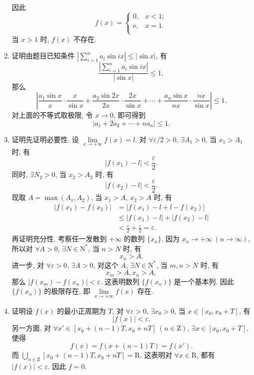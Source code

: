 \begin{enumerate}
\begin{align*}
        \end{align*}
        因此
        \[
            f(x) =
                \begin{cases}
                    0, & x < 1; \\
                    \mathrm{e}, & x = 1. \\
                \end{cases}
        \]
        当 $x > 1$ 时, $f(x)$ 不存在.
    \item %
        {\heiti 证明}\quad 由题目已知条件 $\left|\sum\limits_{i=1}^n a_i\sin ix\right| \leqslant |\sin x|$, 有
        \[
            \frac{\left|\sum\limits_{i=1}^n a_i\sin ix\right|}{|\sin x|} \leqslant 1,   
        \]
        那么
        \[
            \left| \frac{a_1\sin x}{x}\cdot\frac{x}{\sin x} + \frac{a_2\sin2x}{2x}\cdot\frac{2x}{\sin x} + \cdots + \frac{a_n\sin x}{nx}\cdot\frac{nx}{\sin x} \right| \leqslant 1.
        \]
        对上面的不等式取极限, 令 $x \to 0$, 即可得到
        \[
            |a_1 + 2a_2 + \cdots + na_n| \leqslant 1.
        \]
    \item %
        {\heiti 证明}\quad 先证明必要性. 设 $\lim\limits_{x\to+\infty}f(x) = l$. 对 $\forall \varepsilon/2 > 0$, $\exists A_1 > 0$, 当 $x_1 > A_1$ 时, 有
        \[
            |f(x_1) - l| < \frac\varepsilon2.    
        \]
        同时, $\exists N_2 > 0$, 当 $x_2 > A_2$ 时, 有
        \[
            |f(x_2) - l| < \frac\varepsilon2.    
        \]
        现取 $A = \max(A_1, A_2)$, 当 $x_1 > A$, $x_2 > A$ 时, 有
        \begin{align*}
            |f(x_1) - f(x_2)| &= |f(x_1) - l + l - f(x_2)| \\
                              &\leqslant |f(x_1) - l| + |f(x_2) - l| \\
                              &< \frac\varepsilon2 + \frac\varepsilon2 = \varepsilon.
        \end{align*}
        再证明充分性. 考察任一发散到 $+\infty$ 的数列 $\{x_n\}$. 因为 $x_n\rightarrow+\infty\ (n\to\infty)$, 所以对 $\forall A > 0$, $\exists N \in \mathrm{N}^*$, 当 $n > N$ 时, 有
        \[
            x_n > A.    
        \]
        进一步, 对 $\forall \varepsilon > 0$, $\exists A > 0$, 对这个 $A$, $\exists N \in \mathrm{N}^*$, 当 $m, n > N$ 时, 有
        \[
            x_m > A, x_n > A,    
        \]
        那么 $|f(x_m) - f(x_n)| < \varepsilon$. 这表明数列 $\{f(x_n)\}$ 是一个基本列. 因此 $\{f(x_n)\}$ 的极限存在, 即 $\lim\limits_{x\to+\infty}f(x)$ 存在.
    \item %
        {\heiti 证明}\quad 设 $f(x)$ 的最小正周期为 $T$, 对 $\forall \varepsilon > 0$, $\exists x_0 > 0$, 当 $x \in [x_0, x_0 + T]$, 有
        \[
            |f(x)| < \varepsilon.    
        \]
        另一方面, 对 $\forall x' \in [x_0 + (n-1)T, x_0 + nT]\ (n \in \mathrm{Z})$, $\exists x \in [x_0, x_0 + T]$, 使得
        \[
            f(x) = f(x + (n-1)T) = f(x').    
        \]
        而 $\bigcup\limits_{n\in\mathrm{Z}}[x_0 + (n-1)T, x_0 + nT] = \mathrm{R}$. 这表明对 $\forall x \in \mathrm{R}$, 都有 $|f(x)| < \varepsilon$. 因此 $f = 0$.
\end{enumerate}

% 